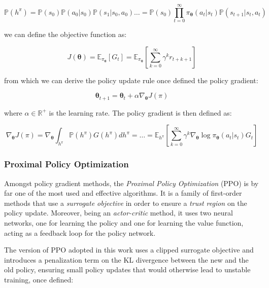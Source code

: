 \begin{equation}
    \mathbb{P}(h ^{\pi}) = \mathbb{P}(s _0) \mathbb{P}(a _0 | s _0) \mathbb{P}(s _1 | s _0, a _0) \dots = \mathbb{P}(s _0) \prod ^{\infty} _{t = 0} \pi _{\boldsymbol{\theta}} (a _t | s _t) \mathbb{P}(s _{t+1} | s _t, a _t)
\end{equation}

we can define the objective function as:

\begin{equation}
    J(\boldsymbol{\theta}) = \mathbb{E} _{\pi _{\boldsymbol{\theta}}} \left[ G _t \right] = \mathbb{E} _{\pi _{\boldsymbol{\theta}}} \left[ \sum ^{\infty} _{k = 0} \gamma ^k r _{t+k+1} \right]
\end{equation}

from which we can derive the policy update rule once defined the policy gradient:

\begin{equation}
    \boldsymbol{\theta} _{t+1} = \boldsymbol{\theta} _t + \alpha \nabla _{\boldsymbol{\theta}} J(\pi)
\end{equation}

where $\alpha \in \mathbb{R} ^+$ is the learning rate. The policy gradient is then defined as:

\begin{equation}
    \nabla _{\boldsymbol{\theta}} J(\pi) = \nabla _{\boldsymbol{\theta}} \int _{h ^{\pi}} \mathbb{P}(h ^{\pi})G(h ^{\pi})dh ^{\pi} = \dots = \mathbb{E} _{h^{\pi}} \left[ \sum ^{\infty} _{k = 0} \gamma ^k \nabla _{\boldsymbol{\theta}} \log \pi _{\boldsymbol{\theta}} (a _t | s _t) G _t \right]
\end{equation}

\subsubsection{Proximal Policy Optimization}

Amongst policy gradient methods, the \textit{Proximal Policy Optimization} (\ac{PPO}) is by far one of the most used and effective algorithms. It is a family of first-order methods that use a \textit{surrogate objective} in order to ensure a \textit{trust region} on the policy update.
Moreover, being an \textit{actor-critic} method, it uses two neural networks, one for learning the policy and one for learning the value function, acting as a feedback  loop for the policy network.

The version of \ac{PPO} adopted in this work uses a clipped surrogate objective and introduces a penalization term on the \ac{KL} divergence between the new and the old policy, ensuring small policy updates that would otherwise lead to unstable training, once defined:

